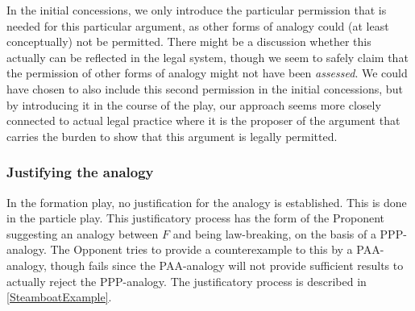 			In the initial concessions, we only introduce the particular permission that is needed for this particular argument, as other forms of analogy could (at least conceptually) not be permitted. There might be a discussion whether this actually can be reflected in the legal system, though we seem to safely claim that the permission of other forms of analogy might not have been \textit{assessed}. We could have chosen to also include this second permission in the initial concessions, but by introducing it in the course of the play, our approach seems more closely connected to actual legal practice where it is the proposer of the argument that carries the burden to show that this argument is legally permitted. 
			
			
			\subsubsection{Justifying the analogy}
			
			In the formation play, no justification for the analogy is established. This is done in the particle play. This justificatory process has the form of the Proponent suggesting an analogy between $F$ and being law-breaking, on the basis of a PPP-analogy. The Opponent tries to provide a counterexample to this by a PAA-analogy, though fails since the PAA-analogy will not provide sufficient results to actually reject the PPP-analogy. The justificatory process is described in \autoref{SteamboatExample}.
			
